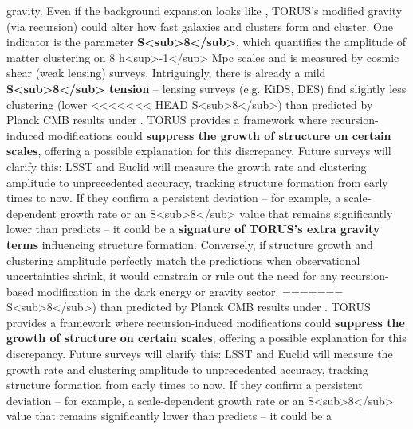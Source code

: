 \documentclass[]{article}
\begin{document}
\begin{itemize}
  gravity. Even if the background expansion looks like \LambdaCDM, TORUS's
  modified gravity (via recursion) could alter how fast galaxies and
  clusters form and cluster. One indicator is the parameter
  \textbf{S\textless{}sub\textgreater{}8\textless{}/sub\textgreater{}},
  which quantifies the amplitude of matter clustering on 8
  h\textless{}sup\textgreater{}-1\textless{}/sup\textgreater{} Mpc
  scales and is measured by cosmic shear (weak lensing) surveys.
  Intriguingly, there is already a mild
  \textbf{S\textless{}sub\textgreater{}8\textless{}/sub\textgreater{}
  tension} -- lensing surveys (e.g. KiDS, DES) find slightly less
  clustering (lower
<<<<<<< HEAD
  S\textless sub\textgreater8\textless/sub\textgreater) than predicted
  by Planck CMB results under \LambdaCDM. TORUS provides a framework where
  recursion-induced modifications could \textbf{suppress the growth of
  structure on certain scales}, offering a possible explanation for this
  discrepancy\hspace{0pt}. Future surveys will clarify this: LSST and
  Euclid will measure the growth rate and clustering amplitude to
  unprecedented accuracy, tracking structure formation from early times
  to now. If they confirm a persistent deviation -- for example, a
  scale-dependent growth rate or an
  S\textless sub\textgreater8\textless/sub\textgreater{} value that
  remains significantly lower than \LambdaCDM predicts -- it could be a
  \textbf{signature of TORUS's extra gravity terms} influencing
  structure formation\hspace{0pt}. Conversely, if structure growth and
  clustering amplitude perfectly match the \LambdaCDM predictions when
  observational uncertainties shrink, it would constrain or rule out the
  need for any recursion-based modification in the dark energy or
  gravity sector.
=======
  S\textless{}sub\textgreater{}8\textless{}/sub\textgreater{}) than
  predicted by Planck CMB results under \LambdaCDM. TORUS provides a framework
  where recursion-induced modifications could \textbf{suppress the
  growth of structure on certain scales}, offering a possible
  explanation for this discrepancy​. Future surveys will clarify this:
  LSST and Euclid will measure the growth rate and clustering amplitude
  to unprecedented accuracy, tracking structure formation from early
  times to now. If they confirm a persistent deviation -- for example, a
  scale-dependent growth rate or an
  S\textless{}sub\textgreater{}8\textless{}/sub\textgreater{} value that
  remains significantly lower than \LambdaCDM predicts -- it could be a

\end{itemize}
\end{document}
